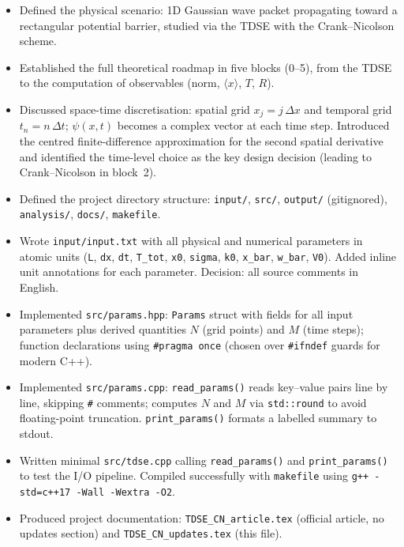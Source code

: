 \documentclass[a4paper,12pt]{article}
\begin{document}
\begin{itemize}

  \item Defined the physical scenario: 1D Gaussian wave packet propagating
        toward a rectangular potential barrier, studied via the TDSE with
        the Crank--Nicolson scheme.

  \item Established the full theoretical roadmap in five blocks (0--5),
        from the TDSE to the computation of observables
        (norm, $\langle x\rangle$, $T$, $R$).

  \item Discussed space-time discretisation: spatial grid
        $x_j = j\,\Delta x$ and temporal grid $t_n = n\,\Delta t$;
        $\psi(x,t)$ becomes a complex vector at each time step.
        Introduced the centred finite-difference approximation for the
        second spatial derivative and identified the time-level choice as
        the key design decision (leading to Crank--Nicolson in block~2).

  \item Defined the project directory structure:
        \texttt{input/}, \texttt{src/}, \texttt{output/} (gitignored),
        \texttt{analysis/}, \texttt{docs/}, \texttt{makefile}.

  \item Wrote \texttt{input/input.txt} with all physical and numerical
        parameters in atomic units
        (\texttt{L}, \texttt{dx}, \texttt{dt}, \texttt{T\_tot},
         \texttt{x0}, \texttt{sigma}, \texttt{k0},
         \texttt{x\_bar}, \texttt{w\_bar}, \texttt{V0}).
        Added inline unit annotations for each parameter.
        Decision: all source comments in English.

  \item Implemented \texttt{src/params.hpp}: \texttt{Params} struct with
        fields for all input parameters plus derived quantities $N$
        (grid points) and $M$ (time steps); function declarations using
        \texttt{\#pragma once} (chosen over \texttt{\#ifndef} guards for
        modern C++).

  \item Implemented \texttt{src/params.cpp}: \texttt{read\_params()} reads
        key--value pairs line by line, skipping \texttt{\#} comments;
        computes $N$ and $M$ via \texttt{std::round} to avoid
        floating-point truncation. \texttt{print\_params()} formats a
        labelled summary to stdout.

  \item Written minimal \texttt{src/tdse.cpp} calling
        \texttt{read\_params()} and \texttt{print\_params()} to test the
        I/O pipeline. Compiled successfully with \texttt{makefile} using
        \texttt{g++ -std=c++17 -Wall -Wextra -O2}.

  \item Produced project documentation:
        \texttt{TDSE\_CN\_article.tex} (official article, no updates
        section) and \texttt{TDSE\_CN\_updates.tex} (this file).

\end{itemize}
\end{document}
